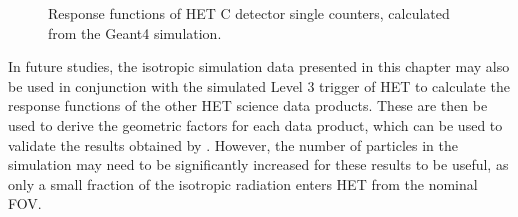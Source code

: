 \begin{figure}
	\centering
	
	\caption[Response functions of \acs{HET} C detector single counters]{Response functions of \ac{HET} C detector single counters, calculated from the \ac{Geant4} simulation.}
	\label{fig:het_c_responsefunction}
\end{figure}

In future studies, the isotropic simulation data presented in this chapter may also be used in conjunction with the simulated Level 3 trigger of HET to calculate the response functions of the other \ac{HET} science data products. These are then be used to derive the geometric factors for each data product, which can be used to validate the results obtained by \citet{Elftmann-2020-PhD}. However, the number of particles in the simulation may need to be significantly increased for these results to be useful, as only a small fraction of the isotropic radiation enters HET from the nominal \ac{FOV}.